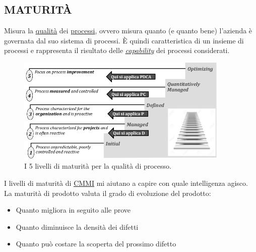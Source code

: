 		\subsection{MATURITÀ}  \label{maturita} %
		Misura la \underline{\hyperref[qualita]{qualità}} dei \underline{\hyperref[processo]{processi}}, ovvero misura quanto (e quanto bene) l’azienda è governata dal suo sistema di processi. È quindi caratteristica di un insieme di processi e rappresenta il risultato delle \textit{\underline{\hyperref[capability]{capability}}} dei processi considerati.
		\begin{figure}[H]
			\centering
			\includegraphics[width=0.9\textwidth]{img/maturity}
			\caption{I 5 livelli di maturità per la qualità di processo.}
		\end{figure}
		I livelli di maturità di \underline{\hyperref[cmmi]{CMMI}} mi aiutano a capire con quale intelligenza agisco.\\
		La maturità di prodotto valuta il grado di evoluzione del prodotto:
		\begin{itemize}
			\item Quanto migliora in seguito alle prove
			\item Quanto diminuisce la densità dei difetti
			\item Quanto può costare la scoperta del prossimo difetto
		\end{itemize}


